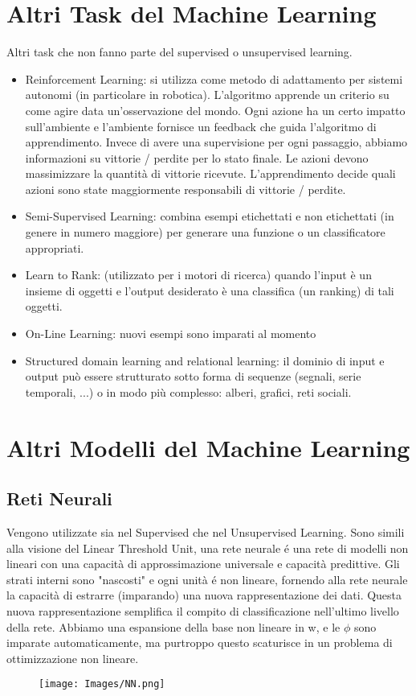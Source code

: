 \documentclass{article}
\begin{document}
\section{Altri Task del Machine Learning}
Altri task che non fanno parte del supervised o unsupervised learning.
\begin{itemize}
    \item Reinforcement Learning: si utilizza come metodo di adattamento per sistemi autonomi (in particolare in robotica). L'algoritmo apprende un criterio su come agire data un'osservazione del mondo. Ogni azione ha un certo impatto sull'ambiente e l'ambiente fornisce un feedback che guida l'algoritmo di apprendimento. Invece di avere una supervisione per ogni passaggio, abbiamo informazioni su vittorie / perdite per lo stato finale. Le azioni devono massimizzare la quantità di vittorie ricevute. L'apprendimento decide quali azioni sono state maggiormente responsabili di vittorie / perdite.
    \item Semi-Supervised Learning: combina esempi etichettati e non etichettati (in genere in numero maggiore) per generare una funzione o un classificatore appropriati.
    \item Learn to Rank: (utilizzato per i motori di ricerca) quando l'input è un insieme di oggetti e l'output desiderato è una classifica (un ranking) di tali oggetti.
    \item On-Line Learning: nuovi esempi sono imparati al momento
    \item Structured domain learning and relational learning: il dominio di input e output può essere strutturato sotto forma di sequenze (segnali, serie temporali, ...) o in modo più complesso: alberi, grafici, reti sociali.
\end{itemize}

\section{Altri Modelli del Machine Learning}
\subsection{Reti Neurali}
Vengono utilizzate sia nel Supervised che nel Unsupervised Learning. Sono simili alla visione del Linear Threshold Unit, una rete neurale é una rete di modelli non lineari con una capacità di approssimazione universale e capacità predittive. Gli strati interni sono "nascosti" e ogni unità é non lineare, fornendo alla rete neurale la capacità di estrarre (imparando) una nuova rappresentazione dei dati. Questa nuova rappresentazione semplifica il compito di classificazione nell'ultimo livello della rete. \newline 
Abbiamo una espansione della base non lineare in w, e le $\phi$ sono imparate automaticamente, ma purtroppo questo scaturisce in un problema di ottimizzazione non lineare. 
\begin{figure}[H]
\centering
\texttt{[image: Images/NN.png]}
\end{figure}
\end{document}
